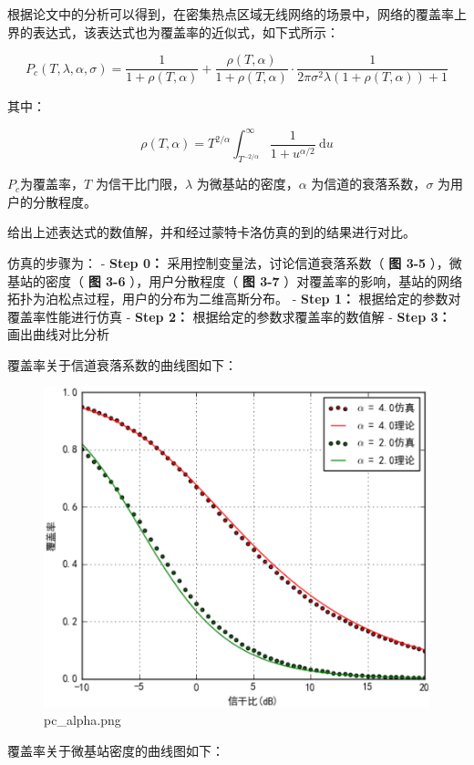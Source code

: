\documentclass[11pt]{article}
\makeatletter
\def\maxwidth{\ifdim\Gin@nat@width>\linewidth\linewidth
    \else\Gin@nat@width\fi}
\let\Oldincludegraphics\includegraphics
\renewcommand{\includegraphics}[1]{\Oldincludegraphics[width=.8\maxwidth]{#1}}
\makeatother
\begin{document}
根据论文中的分析可以得到，在密集热点区域无线网络的场景中，网络的覆盖率上界的表达式，该表达式也为覆盖率的近似式，如下式所示：

\[\tag{1}
P_c(T,\lambda,\alpha,\sigma) =  \frac{1}{1+\rho(T,\alpha)} + \frac{\rho(T, \alpha)}{1+\rho(T,\alpha)} \cdot \frac{1}{2\pi\sigma^2\lambda(1+\rho(T,\alpha))+1}
\]

其中：

\[\tag{2}
\rho(T,\alpha)=T^{2/\alpha}\int_{T^{-2/\alpha}}^{\infty} \frac{1}{1+u^{\alpha/2}}\ \mathrm{d}u
\]

\(P_c\)为覆盖率，\(T\) 为信干比门限，\(\lambda\)
为微基站的密度，\(\alpha\) 为信道的衰落系数，\(\sigma\)
为用户的分散程度。

给出上述表达式的数值解，并和经过蒙特卡洛仿真的到的结果进行对比。

仿真的步骤为： - \textbf{Step 0：} 采用控制变量法，讨论信道衰落系数（
\textbf{图 3-5} ），微基站的密度（ \textbf{图 3-6} ），用户分散程度（
\textbf{图 3-7}
）对覆盖率的影响，基站的网络拓扑为泊松点过程，用户的分布为二维高斯分布。
- \textbf{Step 1：} 根据给定的参数对覆盖率性能进行仿真 - \textbf{Step
2：} 根据给定的参数求覆盖率的数值解 - \textbf{Step 3：} 画出曲线对比分析

覆盖率关于信道衰落系数的曲线图如下：

\begin{figure}[htbp]
\centering
\includegraphics{pc_alpha.png}
\caption{pc\_alpha.png}
\end{figure}

覆盖率关于微基站密度的曲线图如下：
\end{document}
